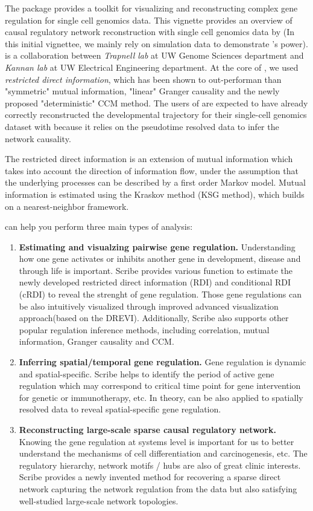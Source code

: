 \documentclass[10pt,oneside]{article}\usepackage[]{graphicx}\usepackage[]{color}
\begin{document}
 The  package provides a toolkit for visualizing and reconstructing complex gene regulation for single cell genomics data. This vignette provides an overview of causal regulatory network reconstruction with single cell genomics data by  (In this initial vignettee, we mainly rely on simulation data to demonstrate 's power).  is a collaboration between \emph{Trapnell lab} at UW Genome Sciences department and \emph{Kannan lab} at UW Electrical Engineering department. At the core of , we used \emph{restricted direct information}, which has been shown to out-performan than "symmetric" mutual information, "linear" Granger causality and the newly proposed "deterministic" CCM method. The users of  are expected to have already correctly reconstructed the developmental trajectory for their single-cell genomics dataset with  because it relies on the pseudotime resolved data to infer the network causality. 

The restricted direct information is an extension of mutual information which takes into account the direction of information flow, under the assumption that the underlying processes can be described by a first order Markov model. Mutual information is estimated using the Kraskov method (KSG method), which builds on a nearest-neighbor framework.

  can help you perform three main types of analysis:
 \begin{enumerate}
 \item \textbf{Estimating and visualzing pairwise gene regulation.} Understanding how one gene activates or inhibits another gene in development, disease and through life is important. Scribe provides various function to estimate the newly developed restricted direct information (RDI) and conditional RDI (cRDI) to reveal the strenght of gene regulation. Those gene regulations can be also intuitively visualized through improved advanced visualization approach(based on the DREVI). Additionally, Scribe also supports other popular regulation inference methods, including correlation, mutual information, Granger causality and CCM. 
 \item \textbf{Inferring spatial/temporal gene regulation.} Gene regulation is dynamic and spatial-specific. Scribe helps to identify the period of active gene regulation which may correspond to critical time point for gene intervention for genetic or immunotherapy, etc. In theory,  can be also applied to spatially resolved data to reveal spatial-specific gene regulation. 
 \item \textbf{Reconstructing large-scale sparse causal regulatory network.} Knowing the gene regulation at systems level is important for us to better understand the mechanisms of cell differentiation and carcinogenesis, etc. The regulatory hierarchy, network motifs / hubs are also of great clinic interests. Scribe provides a newly invented method for recovering a sparse direct network capturing the network regulation from the data but also satisfying well-studied large-scale network topologies.   
 
 \end{enumerate}
 
\end{document}
